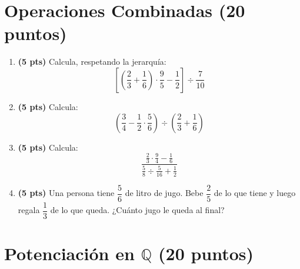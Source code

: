 \documentclass[12pt, letterpaper]{article}
\begin{document}
\newpage

\section{Operaciones Combinadas (20 puntos)}

\begin{enumerate}[leftmargin=*]
  \item \textbf{(5 pts)} Calcula, respetando la jerarquía:
        \[
          \left[\left(\frac{2}{3} + \frac{1}{6}\right) \cdot \frac{9}{5} - \frac{1}{2}\right] \div \frac{7}{10}
        \]

  \item \textbf{(5 pts)} Calcula:
        \[
          \left(\frac{3}{4} - \frac{1}{2} \cdot \frac{5}{6}\right) \div \left(\frac{2}{3} + \frac{1}{6}\right)
        \]

  \item \textbf{(5 pts)} Calcula:
        \[
          \frac{\frac{2}{3} \cdot \frac{9}{4} - \frac{1}{6}}{\frac{5}{8} \div \frac{5}{16} + \frac{1}{2}}
        \]

  \item \textbf{(5 pts)} Una persona tiene $\dfrac{5}{6}$ de litro de jugo. Bebe $\dfrac{2}{5}$ de lo que tiene y luego regala $\dfrac{1}{3}$ de lo que queda. ¿Cuánto jugo le queda al final?
\end{enumerate}

\newpage

\section{Potenciación en $\mathbb{Q}$ (20 puntos)}
\end{document}
